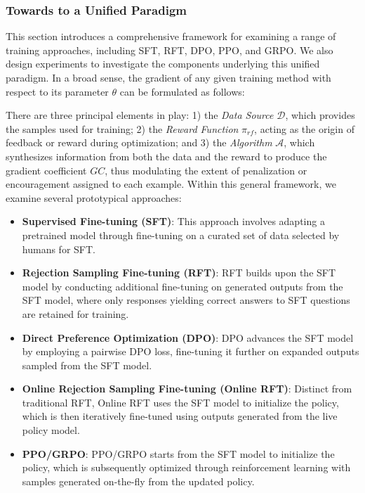 \begin{itemize}[topsep=0pt]
\subsubsection{Towards to a Unified Paradigm} This section introduces a comprehensive framework for examining a range of training approaches, including SFT, RFT, DPO, PPO, and GRPO. We also design experiments to investigate the components underlying this unified paradigm. In a broad sense, the gradient of any given training method with respect to its parameter $\theta$ can be formulated as follows:

There are three principal elements in play: 1) the \textit{Data Source} $\mathcal{D}$, which provides the samples used for training; 2) the \textit{Reward Function} $\pi_{{rf}}$, acting as the origin of feedback or reward during optimization; and 3) the \textit{Algorithm} $\mathcal{A}$, which synthesizes information from both the data and the reward to produce the gradient coefficient $GC$, thus modulating the extent of penalization or encouragement assigned to each example. Within this general framework, we examine several prototypical approaches:

\begin{itemize}
    \item \textbf{Supervised Fine-tuning (SFT)}: This approach involves adapting a pretrained model through fine-tuning on a curated set of data selected by humans for SFT.
    \item \textbf{Rejection Sampling Fine-tuning (RFT)}: RFT builds upon the SFT model by conducting additional fine-tuning on generated outputs from the SFT model, where only responses yielding correct answers to SFT questions are retained for training.
    \item \textbf{Direct Preference Optimization (DPO)}: DPO advances the SFT model by employing a pairwise DPO loss, fine-tuning it further on expanded outputs sampled from the SFT model.
    \item \textbf{Online Rejection Sampling Fine-tuning (Online RFT)}: Distinct from traditional RFT, Online RFT uses the SFT model to initialize the policy, which is then iteratively fine-tuned using outputs generated from the live policy model.
    \item \textbf{PPO/GRPO}: PPO/GRPO starts from the SFT model to initialize the policy, which is subsequently optimized through reinforcement learning with samples generated on-the-fly from the updated policy.
\end{itemize}


\end{itemize}
